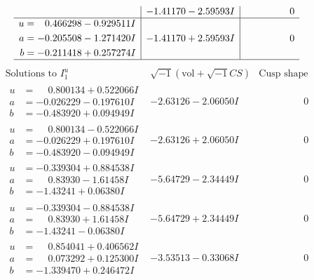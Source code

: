 \documentclass[1p]{elsarticle_modified}
\theoremstyle{definition}
\newcommand{\I}{\sqrt{-1}}
\begin{document}
$$\begin{array}{c|c|c}
 & -1.41170 - 2.59593 I & \phantom{-0.000000 } 0 \\ \hline\begin{aligned}
u &= \phantom{-}0.466298 - 0.929511 I \\
a &= -0.205508 - 1.271420 I \\
b &= -0.211418 + 0.257274 I\end{aligned}
 & -1.41170 + 2.59593 I & \phantom{-0.000000 } 0\\
 \hline 
 \end{array}$$\newpage$$\begin{array}{c|c|c}  
\text{Solutions to }I^u_{1}& \I (\text{vol} + \sqrt{-1}CS) & \text{Cusp shape}\\
 \hline 
\begin{aligned}
u &= \phantom{-}0.800134 + 0.522066 I \\
a &= -0.026229 - 0.197610 I \\
b &= -0.483920 + 0.094949 I\end{aligned}
 & -2.63126 - 2.06050 I & \phantom{-0.000000 } 0 \\ \hline\begin{aligned}
u &= \phantom{-}0.800134 - 0.522066 I \\
a &= -0.026229 + 0.197610 I \\
b &= -0.483920 - 0.094949 I\end{aligned}
 & -2.63126 + 2.06050 I & \phantom{-0.000000 } 0 \\ \hline\begin{aligned}
u &= -0.339304 + 0.884538 I \\
a &= \phantom{-}0.83930 - 1.61458 I \\
b &= -1.43241 + 0.06380 I\end{aligned}
 & -5.64729 - 2.34449 I & \phantom{-0.000000 } 0 \\ \hline\begin{aligned}
u &= -0.339304 - 0.884538 I \\
a &= \phantom{-}0.83930 + 1.61458 I \\
b &= -1.43241 - 0.06380 I\end{aligned}
 & -5.64729 + 2.34449 I & \phantom{-0.000000 } 0 \\ \hline\begin{aligned}
u &= \phantom{-}0.854041 + 0.406562 I \\
a &= \phantom{-}0.073292 + 0.125300 I \\
b &= -1.339470 + 0.246472 I\end{aligned}
 & -3.53513 - 0.33068 I & \phantom{-0.000000 } 0 \\ \hline\begin{aligned}

\end{aligned}
\end{array}$$
\end{document}

